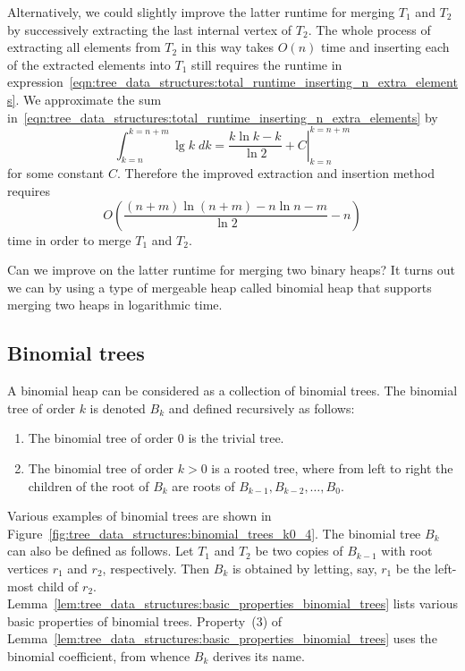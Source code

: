 Alternatively, we could slightly improve the latter runtime for
merging $T_1$ and $T_2$ by successively extracting the last internal
vertex of $T_2$. The whole process of extracting all elements from
$T_2$ in this way takes $O(n)$ time and inserting each of the
extracted elements into $T_1$ still requires the runtime in
expression~\eqref{eqn:tree_data_structures:total_runtime_inserting_n_extra_elements}.
We approximate the sum
in~\eqref{eqn:tree_data_structures:total_runtime_inserting_n_extra_elements}
by
\[
\int_{k=n}^{k=n+m} \lg k \; dk
=
\left. \frac{k \ln k - k} {\ln 2} + C \right|_{k=n}^{k=n+m}
\]
for some constant $C$. Therefore the improved extraction and
insertion method requires
\[
O\left(
\frac{(n+m) \ln(n+m) - n \ln n - m} {\ln 2} - n
\right)
\]
time in order to merge $T_1$ and $T_2$.

Can we improve on the latter runtime for merging two binary heaps? It
turns out we can by using a type of mergeable heap called
binomial heap that supports merging two heaps in
logarithmic time.



\subsection{Binomial trees}

A binomial heap can be considered as a collection of binomial
trees. The binomial tree of order $k$ is denoted $B_k$ and defined
recursively as follows:
\begin{enumerate}
\item The binomial tree of order $0$ is the trivial tree.

\item The binomial tree of order $k > 0$ is a rooted tree, where from
  left to right the children of the root of $B_k$ are roots of
  $B_{k-1}, B_{k-2}, \dots, B_0$.
\end{enumerate}
Various examples of binomial trees are shown in
Figure~\ref{fig:tree_data_structures:binomial_trees_k0_4}. The
binomial tree $B_k$ can also be defined as follows. Let $T_1$ and
$T_2$ be two copies of $B_{k-1}$ with root vertices $r_1$ and $r_2$,
respectively. Then $B_k$ is obtained by letting, say, $r_1$ be the
left-most child of $r_2$.
Lemma~\ref{lem:tree_data_structures:basic_properties_binomial_trees}
lists various basic properties of binomial trees. Property~(3) of
Lemma~\ref{lem:tree_data_structures:basic_properties_binomial_trees}
uses the binomial coefficient, from whence
$B_k$ derives its name.

